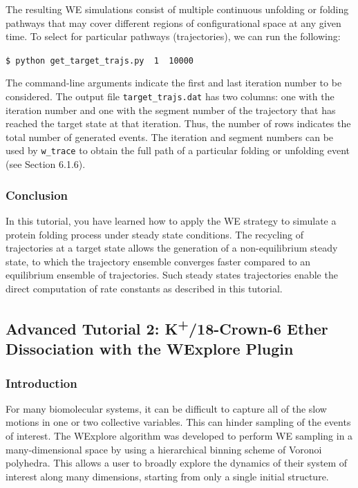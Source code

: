 \documentclass[9pt,tutorial,pubversion]{livecoms}
\begin{document}
The resulting WE simulations consist of multiple continuous unfolding or folding pathways that may cover different regions of configurational space at any given time. 
To select for particular pathways (trajectories), we can run the following: 
 
\verb|$ python get_target_trajs.py  1  10000|

The command-line arguments indicate the first and last iteration number to be considered. 
The output file \verb|target_trajs.dat| has two columns: one with the iteration number and one with the segment number of the trajectory that has reached the target state at that iteration. 
Thus, the number of rows indicates the total number of generated events. 
The iteration and segment numbers can be used by \verb|w_trace| to obtain the full path of a particular folding or unfolding event (see Section 6.1.6).

\subsubsection{Conclusion}

In this tutorial, you have learned how to apply the WE strategy to simulate a protein folding process under steady state conditions. 
The recycling of trajectories at a target state allows the generation of a non-equilibrium steady state, to which the trajectory ensemble converges faster compared to an equilibrium ensemble of trajectories. 
Such steady states trajectories enable  the direct computation of rate constants as described in this tutorial.   

\subsection{Advanced Tutorial 2: K\textsuperscript{+}/18-Crown-6 Ether Dissociation with the WExplore Plugin}

\subsubsection{Introduction}

For many biomolecular systems, it can be difficult to capture all of the slow motions in one or two collective variables. 
This can hinder sampling of the events of interest. 
The WExplore algorithm was developed to perform WE sampling in a many-dimensional space by using a hierarchical binning scheme of Voronoi polyhedra. 
This allows a user to broadly explore the dynamics of their system of interest along many dimensions, starting from only a single initial structure.
\end{document}
